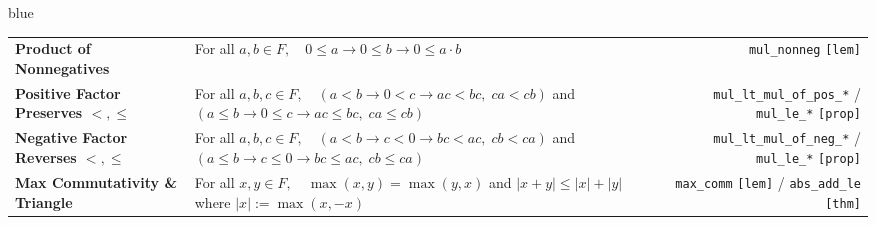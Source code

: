 \documentclass[10pt]{article}
\newcommand{\lean}[1]{\texttt{\scriptsize\color{navy}#1}}
\newcommand{\kind}[1]{\texttt{\scriptsize\color{muted}[#1]}}
\begin{document}
\begin{axbox}[title={Group 6: Order, Multiplication, Maximum \& Absolute Value}]{blue}
\scriptsize
\begin{tabularx}{\linewidth}{@{}>{\raggedright\arraybackslash}p{4.2cm} >{\raggedright\arraybackslash}X r@{}}
\textbf{Product of Nonnegatives} & For all $a, b \in F,\quad 0 \le a \to 0 \le b \to 0 \le a \cdot b$ & \lean{mul\_nonneg} \kind{lem} \\
\textbf{Positive Factor Preserves $<, \le$} & For all $a, b, c \in F,\quad (a < b \to 0 < c \to a c < b c,\; c a < c b)$ and $(a \le b \to 0 \le c \to a c \le b c,\; c a \le c b)$ & \lean{mul\_lt\_mul\_of\_pos\_*} / \lean{mul\_le\_*} \kind{prop} \\
\textbf{Negative Factor Reverses $<, \le$} & For all $a, b, c \in F,\quad (a < b \to c < 0 \to b c < a c,\; c b < c a)$ and $(a \le b \to c \le 0 \to b c \le a c,\; c b \le c a)$ & \lean{mul\_lt\_mul\_of\_neg\_*} / \lean{mul\_le\_*} \kind{prop} \\
\textbf{Max Commutativity \& Triangle} & For all $x, y \in F,\quad \max(x, y) = \max(y, x)$ \quad and \quad $|x + y| \le |x| + |y|$ \quad where $|x| := \max(x, -x)$ & \lean{max\_comm} \kind{lem} / \lean{abs\_add\_le} \kind{thm} \\
\end{tabularx}
\end{axbox}
\end{document}
